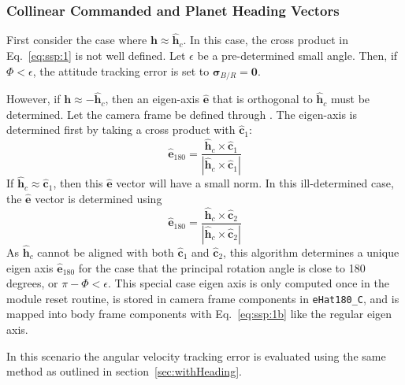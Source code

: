  \subsubsection{Collinear Commanded and Planet Heading Vectors}
First consider the case where $\bm h \approx \hat{\bm h}_{c}$.  In this case, the cross product in Eq.~\eqref{eq:ssp:1} is not well defined.  Let $\epsilon$ be a pre-determined small angle.  Then, if $\Phi < \epsilon$, the attitude tracking error is set to $\bm\sigma_{B/R} = \bm 0$.

However, if $\bm h \approx -\hat{\bm h}_{c}$, then an eigen-axis $\hat{\bm e}$ that is orthogonal to $\hat{\bm h}_{c}$ must be determined.  Let the camera frame be defined through .  The eigen-axis is determined first by taking a cross product with $\hat{\bm c}_{1}$:
 \begin{equation}
	\label{eq:ssp:7}
	\hat{\bm e}_{180} = \frac{ \hat{\bm h}_{c} \times \hat{\bm c}_{1}}{| \hat{\bm h}_{c} \times \hat{\bm c}_{1}|}
\end{equation}
If $\hat{\bm h}_{c} \approx \hat{\bm c}_{1}$, then this $\hat{\bm e}$ vector will have a small norm.  In this ill-determined case, the $\hat{\bm e}$ vector is determined using
 \begin{equation}
	\label{eq:ssp:8}
	\hat{\bm e}_{180} = \frac{ \hat{\bm h}_{c} \times \hat{\bm c}_{2}}{| \hat{\bm h}_{c} \times \hat{\bm c}_{2}|}
\end{equation}
As $ \hat{\bm h}_{c}$ cannot be aligned with both $\hat{\bm c}_{1}$ and $\hat{\bm c}_{2}$, this algorithm determines a unique eigen axis $\hat{\bm e}_{180}$ for the case that the principal rotation angle is close to 180 degrees, or $\pi - \Phi < \epsilon$.  This special case eigen axis is only computed once in the module reset routine, is stored in camera frame components in {\tt eHat180\_C}, and is mapped into body frame components with Eq.~\eqref{eq:ssp:1b} like the regular eigen axis.

In this scenario the angular velocity tracking error is evaluated using the same method as outlined in section~\ref{sec:withHeading}.
